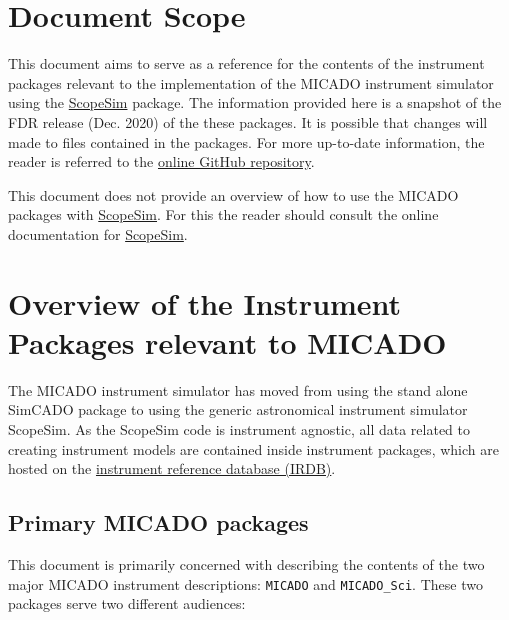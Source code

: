 

\section{Document Scope%
  \label{document-scope}%
}

This document aims to serve as a reference for the contents of the instrument packages relevant to the implementation of the MICADO instrument simulator using the \href{https://scopesim.readthedocs.io/en/latest/}{ScopeSim} package.
The information provided here is a snapshot of the FDR release (Dec. 2020) of the these packages.
It is possible that changes will made to files contained in the packages.
For more up-to-date information, the reader is referred to the \href{https://github.com/astronomyk/irdb}{online GitHub repository}.

This document does not provide an overview of how to use the MICADO packages with \href{https://scopesim.readthedocs.io/en/latest/}{ScopeSim}.
For this the reader should consult the online documentation for \href{https://scopesim.readthedocs.io/en/latest/}{ScopeSim}.


\section{Overview of the Instrument Packages relevant to MICADO%
  \label{overview-of-the-instrument-packages-relevant-to-micado}%
}

The MICADO instrument simulator has moved from using the stand alone SimCADO package to using the generic astronomical instrument simulator ScopeSim.
As the ScopeSim code is instrument agnostic, all data related to creating instrument models are contained inside instrument packages, which are hosted on the \href{https://github.com/astronomyk/irdb}{instrument reference database (IRDB)}.


\subsection{Primary MICADO packages%
  \label{primary-micado-packages}%
}

This document is primarily concerned with describing the contents of the two major MICADO instrument descriptions: \texttt{MICADO} and \texttt{MICADO\_Sci}.
These two packages serve two different audiences:

